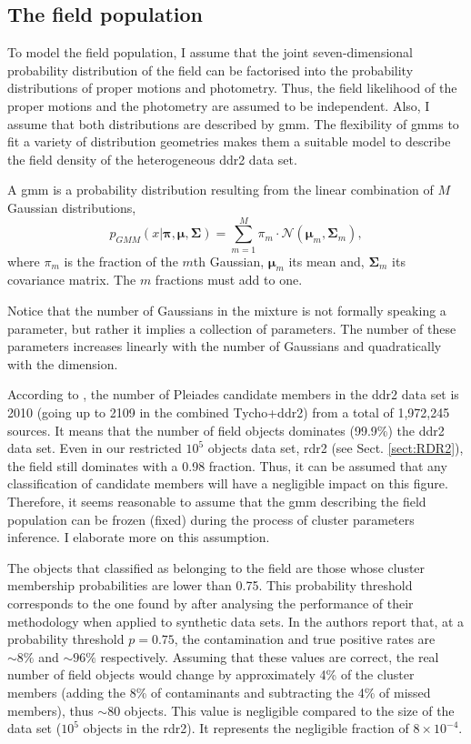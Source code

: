 \subsection{The field population}
\label{sect:field_population}
To model the field population, I assume that the joint seven-dimensional probability distribution of the field can be factorised into the probability distributions of proper motions and photometry. Thus, the field likelihood of the proper motions and the photometry are assumed to be independent. Also, I assume that both distributions are described by \gls{gmm}. The flexibility of \glspl{gmm} to fit a variety of distribution geometries makes them a suitable model to describe the field density of the heterogeneous \gls{ddr2} data set. 

A \gls{gmm} is a probability distribution resulting from the linear combination of $M$ Gaussian distributions, 
\begin{equation}
p_{GMM}(x|\boldsymbol{\pi},\boldsymbol{\mu},\boldsymbol{\Sigma})=\sum_{m=1}^M \pi_m \cdot \mathcal{N}(\boldsymbol{\mu}_m,\boldsymbol{\Sigma}_m),
\end{equation}
{where $\pi_m$ is the fraction of the $m$th Gaussian, $\boldsymbol{\mu}_m$ its mean and, $\boldsymbol{\Sigma}_m$ its covariance matrix. The $m$ fractions must add to one. }

{Notice that the number of Gaussians in the mixture is not formally speaking a parameter, but rather it implies a collection of parameters. The number of these parameters increases linearly with the number of Gaussians and quadratically with the dimension.} 

According to \citet{Bouy2015}, the number of Pleiades candidate members in the \gls{ddr2} data set is 2010 (going up to 2109 in the combined Tycho+\gls{ddr2}) from a total of 1,972,245 sources. It means that the number of field objects dominates (99.9\%) the \gls{ddr2} data set. Even in our restricted $10^5$ objects data set, \gls{rdr2} (see Sect. \ref{sect:RDR2}), the field still dominates with a 0.98 fraction. Thus, it can be assumed that any classification of candidate members will have a negligible impact on this figure. Therefore, it seems reasonable to assume that the \gls{gmm} describing the field population can be frozen (fixed) during the process of cluster parameters inference. I elaborate more on this assumption.


The objects that \citet{Bouy2015} classified as belonging to the field are those whose cluster membership probabilities are lower than 0.75. This probability threshold corresponds to the one found by \citet{Sarro2014} after analysing the performance of their methodology when applied to synthetic data sets. In \citet{Sarro2014} the authors report that, at a probability threshold $p=0.75$, the contamination and true positive rates are $\sim 8\%$ and $ \sim96\%$ respectively. Assuming that these values are correct, the real number of field objects would change by approximately 4\% of the cluster members (adding the 8\% of contaminants and subtracting the 4\% of missed members), thus $\sim 80$ objects. This value is negligible compared to the size of the data set ($10^5$ objects in the \gls{rdr2}). It represents the negligible fraction of $ 8\times10^{-4}$. 

